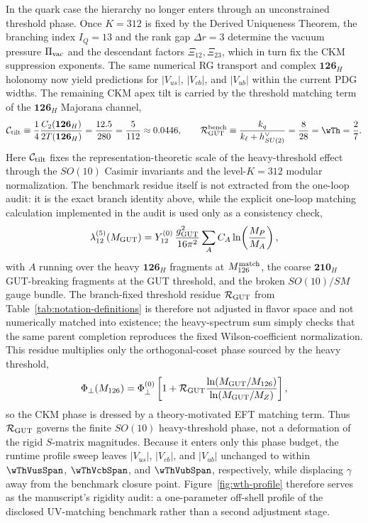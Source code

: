 \documentclass[11pt]{article}
\begin{document}
In the quark case the hierarchy no longer enters through an unconstrained threshold phase. Once $K=312$ is fixed by the Derived Uniqueness Theorem, the branching index $I_Q=13$ and the rank gap $\Delta r=3$ determine the vacuum pressure $\Pi_{\rm vac}$ and the descendant factors $\Xi_{12},\Xi_{23}$, which in turn fix the CKM suppression exponents. The same numerical RG transport and complex $\mathbf{126}_H$ holonomy now yield predictions for $|V_{us}|$, $|V_{cb}|$, and $|V_{ub}|$ within the current PDG widths. The remaining CKM apex tilt is carried by the threshold matching term of the $\mathbf{126}_H$ Majorana channel,
\begin{equation}
 \mathcal C_{\rm tilt}
 \equiv
 \frac{1}{4}\frac{C_2(\mathbf{126}_H)}{2T(\mathbf{126}_H)}
 =
 \frac{12.5}{280}
 =
 \frac{5}{112}
 \approx 0.0446,
 \qquad
 \mathcal R_{\rm GUT}^{\rm bench}
 \equiv
 \frac{k_q}{k_{\ell}+h^{\vee}_{SU(2)}}
 =
 \frac{8}{28}
 = \wTh = \frac{2}{7}.
\end{equation}
Here $\mathcal C_{\rm tilt}$ fixes the representation-theoretic scale of the heavy-threshold effect through the $SO(10)$ Casimir invariants and the level-$K=312$ modular normalization. The benchmark residue itself is not extracted from the one-loop audit: it is the exact branch identity above, while the explicit one-loop matching calculation implemented in the audit is used only as a consistency check,
\begin{equation}
 \lambda_{12}^{(5)}(M_{\rm GUT})
 =
 Y_{12}^{(0)}\,\frac{g_{\rm GUT}^2}{16\pi^2}
 \sum_A C_A\ln\!\left(\frac{M_P}{M_A}\right),
\end{equation}
with $A$ running over the heavy $\mathbf{126}_H$ fragments at $M_{126}^{\rm match}$, the coarse $\mathbf{210}_H$ GUT-breaking fragments at the GUT threshold, and the broken $SO(10)/SM$ gauge bundle. The branch-fixed threshold residue $\mathcal R_{\rm GUT}$ from Table~\ref{tab:notation-definitions} is therefore not adjusted in flavor space and not numerically matched into existence; the heavy-spectrum sum simply checks that the same parent completion reproduces the fixed Wilson-coefficient normalization. This residue multiplies only the orthogonal-coset phase sourced by the heavy threshold,
\begin{equation}
 \Phi_{\perp}(M_{126})
 =
 \Phi_{\perp}^{(0)}
 \left[1+\mathcal R_{\rm GUT}\frac{\ln(M_{\rm GUT}/M_{126})}{\ln(M_{\rm GUT}/M_Z)}\right],
\end{equation}
so the CKM phase is dressed by a theory-motivated EFT matching term. Thus $\mathcal R_{\rm GUT}$ governs the finite $SO(10)$ heavy-threshold phase, not a deformation of the rigid $S$-matrix magnitudes. Because it enters only this phase budget, the runtime profile sweep leaves $|V_{us}|$, $|V_{cb}|$, and $|V_{ub}|$ unchanged to within $\wThVusSpan$, $\wThVcbSpan$, and $\wThVubSpan$, respectively, while displacing $\gamma$ away from the benchmark closure point. Figure~\ref{fig:wth-profile} therefore serves as the manuscript's rigidity audit: a one-parameter off-shell profile of the disclosed UV-matching benchmark rather than a second adjustment stage.
\end{document}
